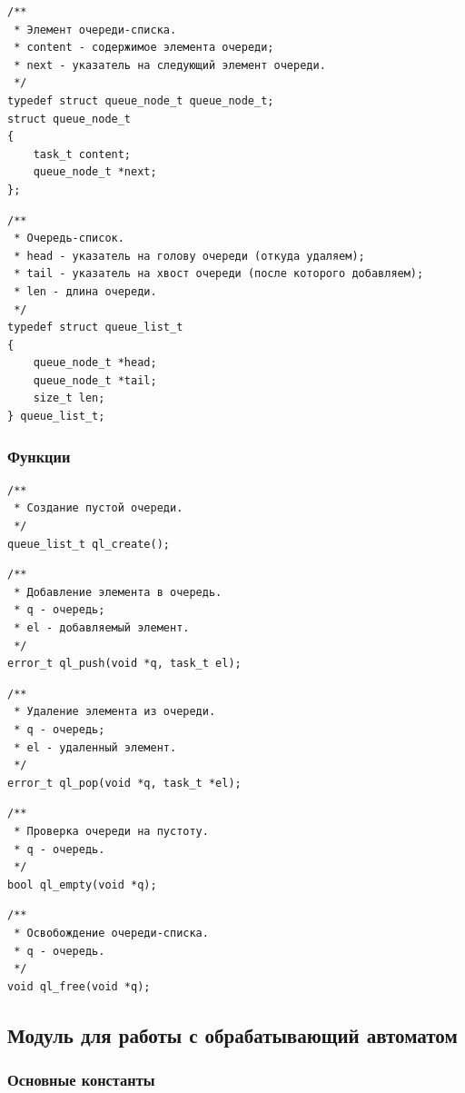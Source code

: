 \documentclass[a4paper,12pt]{extarticle}
\begin{document}
\begin{verbatim}
/**
 * Элемент очереди-списка.
 * content - содержимое элемента очереди;
 * next - указатель на следующий элемент очереди.
 */
typedef struct queue_node_t queue_node_t;
struct queue_node_t
{
    task_t content;
    queue_node_t *next;
};
\end{verbatim}

\begin{verbatim}
/**
 * Очередь-список.
 * head - указатель на голову очереди (откуда удаляем);
 * tail - указатель на хвост очереди (после которого добавляем);
 * len - длина очереди.
 */
typedef struct queue_list_t
{
    queue_node_t *head;
    queue_node_t *tail;
    size_t len;
} queue_list_t;
\end{verbatim}

\subsubsection{Функции}

\begin{verbatim}
/**
 * Создание пустой очереди.
 */
queue_list_t ql_create();
\end{verbatim}

\begin{verbatim}
/**
 * Добавление элемента в очередь.
 * q - очередь;
 * el - добавляемый элемент.
 */
error_t ql_push(void *q, task_t el);
\end{verbatim}

\begin{verbatim}
/**
 * Удаление элемента из очереди.
 * q - очередь;
 * el - удаленный элемент.
 */
error_t ql_pop(void *q, task_t *el);
\end{verbatim}

\begin{verbatim}
/**
 * Проверка очереди на пустоту.
 * q - очередь.
 */
bool ql_empty(void *q);
\end{verbatim}

\begin{verbatim}
/**
 * Освобождение очереди-списка.
 * q - очередь.
 */
void ql_free(void *q);
\end{verbatim}

\subsection{Модуль для работы с обрабатывающий автоматом}
\subsubsection{Основные константы}
\begin{verbatim}
	
\end{verbatim}
\end{document}
